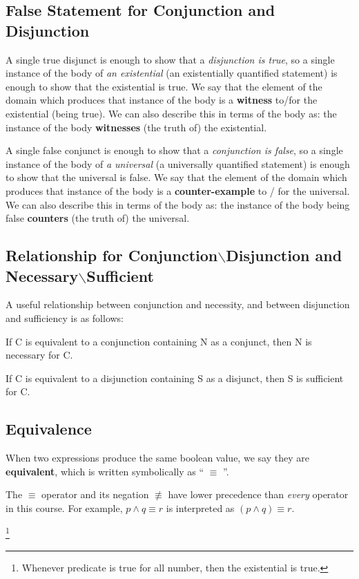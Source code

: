 \documentclass{article}
\begin{document}
\subsection{False Statement for Conjunction and Disjunction}
A single true disjunct is enough to show that a \textit{disjunction is true}, so a single instance of the body of \textit{an existential} (an existentially quantified statement) is enough to show that the existential is true. We say that the element of the domain
which produces that instance of the body is a \textbf{witness} to/for the existential (being true). We can also describe this in terms of the body as: the instance of the body \textbf{witnesses} (the truth of) the existential.

A single false conjunct is enough to show that a \textit{conjunction is false}, so a single instance of the body of \textit{a universal} (a universally quantified statement) is enough to show that the universal is false. We say that the element of the domain which produces that instance of the body is a \textbf{counter-example} to / for the universal. We can also describe this in terms of the body as: the instance
of the body being false \textbf{counters} (the truth of) the universal.

\subsection{Relationship for Conjunction$\backslash$Disjunction and Necessary$\backslash$Sufficient}
A useful relationship between conjunction and necessity, and between disjunction and sufficiency is as follows:

If C is equivalent to a conjunction containing N as a conjunct, then N is necessary for C.

If C is equivalent to a disjunction containing S as a disjunct, then S is sufficient for C.

\subsection{Equivalence}
When two expressions produce the same boolean value, we say they are \textbf{equivalent}, which is written symbolically as “ $\equiv$ ”.

The $\equiv$ operator and its negation $\not\equiv$ have lower precedence than \textit{every} operator in this course. For example, $p \wedge q \equiv r$ is interpreted as $(p \wedge q) \equiv r$.


\footnote{Whenever predicate is true for all number, then the existential is true.}
\end{document}
